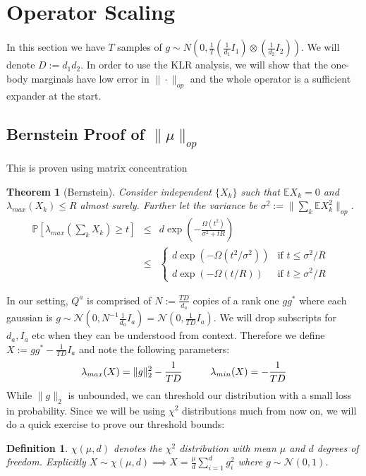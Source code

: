 \documentclass{article}
\newtheorem{theorem}{Theorem}
\newtheorem{definition}{Definition}
\newcommand{\E}{\mathbb{E}}
\renewcommand{\Pr}{\mathbb{P}}
\begin{document}
\section{Operator Scaling}
In this section we have $T$ samples of $g \sim N(0,\frac{1}{T} (\frac{1}{d_{1}} I_{1}) \otimes (\frac{1}{d_{2}} I_{2}))$. We will denote $D := d_{1} d_{2}$. In order to use the KLR analysis, we will show that the one-body marginals have low error in $\|\cdot\|_{op}$ and the whole operator is a sufficient expander at the start. 

\subsection{Bernstein Proof of $\|\mu\|_{op}$}
This is proven using matrix concentration

\begin{theorem} [Bernstein]
Consider independent $\{X_{k}\}$ such that $\E X_{k} = 0$ and $\lambda_{max}(X_{k}) \leq R$ almost surely. Further let the variance be $\sigma^{2} := \|\sum_{k} \E X_{k}^{2} \|_{op}$. 
\begin{eqnarray*} \Pr [ \lambda_{max} \left( \sum_{k} X_{k}  \right) \geq t ] & \leq & d \exp\left( - \frac{\Omega(t^{2})}{\sigma^{2} + t R} \right)
\\ & \leq & \begin{cases} 
d \exp ( - \Omega(t^{2}/\sigma^{2}) ) & \text{if $t \leq \sigma^{2}/R$ } 
\\ d \exp ( - \Omega(t/R) )           & \text{if $t \geq \sigma^{2}/R$}
\end{cases} 
\end{eqnarray*}
\end{theorem}

In our setting, $Q^{a}$ is comprised of $N := \frac{TD}{d_{a}}$ copies of a rank one $g g^{*}$ where each gaussian is $g \sim \mathcal{N}(0, N^{-1} \frac{1}{d_{a}} I_{a} ) = \mathcal{N}(0, \frac{1}{TD} I_{a}) $. We will drop subscripts for $d_{a}, I_{a}$ etc when they can be understood from context. Therefore we define $X := g g^{*} - \frac{1}{TD} I_{a}$ and note the following parameters:
\[ \lambda_{max}(X) = \|g\|_{2}^{2} - \frac{1}{TD} \hspace{10mm} \lambda_{min}(X) = - \frac{1}{TD}   \]
While $\|g\|_{2}$ is unbounded, we can threshold our distribution with a small loss in probability. Since we will be using $\chi^{2}$ distributions much from now on, we will do a quick exercise to prove our threshold bounds:

\begin{definition}
$\chi(\mu,d)$ denotes the $\chi^{2}$ distribution with mean $\mu$ and $d$ degrees of freedom. Explicitly $X \sim \chi(\mu,d) \implies X = \frac{\mu}{d} \sum_{i=1}^{d} g_{i}^{2}$
where $g \sim \mathcal{N}(0,1)$. 
\end{definition}
\end{document}
